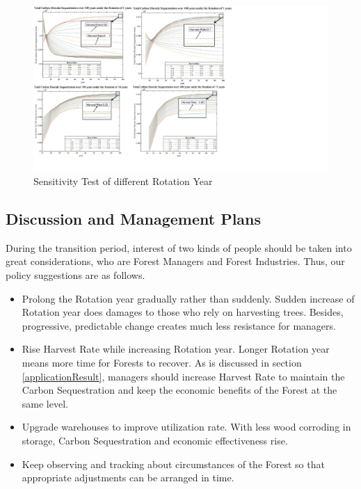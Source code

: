 \documentclass{mcmthesis}
\numberwithin{figure}{section}
\numberwithin{table}{section}
\numberwithin{equation}{section}
\begin{document}
\begin{figure}[htbp]
  \centering
  \includegraphics[width = 16cm]{code&pic/轮伐图.pdf}
  \caption{Sensitivity Test of different Rotation Year}\label{RotationYear}
\end{figure}

\subsection{Discussion and Management Plans}

During the transition period, interest of two kinds of people should be taken into 
great considerations, who are Forest Managers and Forest Industries. Thus, our policy 
suggestions are as follows. 
\par
\begin{itemize}
  \item Prolong the Rotation year gradually rather than suddenly. Sudden increase of 
  Rotation year does damages to those who rely on harvesting trees. Besides, progressive, 
  predictable change creates much less resistance for managers. 
  \item Rise Harvest Rate while increasing Rotation year. Longer Rotation year means more time for Forests to recover. 
  As is discussed in section \ref{applicationResult}, managers should increase Harvest Rate to
  maintain the Carbon Sequestration and keep the economic benefits of the Forest at 
  the same level.
  \item Upgrade warehouses to improve utilization rate. With less wood corroding 
  in storage, Carbon Sequestration and economic effectiveness rise.
  \item Keep observing and tracking about circumstances of the Forest so that appropriate
  adjustments can be arranged in time.
\end{itemize}
\end{document}
